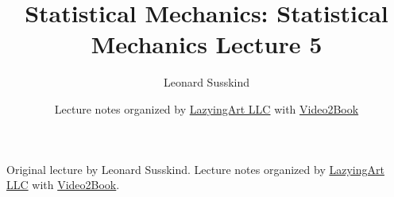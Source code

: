 \documentclass[11pt,oneside]{book}
\begin{document}
\frontmatter
\title{Statistical Mechanics: Statistical Mechanics Lecture 5}
\author{Leonard Susskind}
\date{Lecture notes organized by \href{https://lazying.art}{LazyingArt LLC} with \href{https://github.com/lachlanchen/Video2Book}{Video2Book}}
\maketitle
\begin{center}
\small Original lecture by Leonard Susskind. Lecture notes organized by \href{https://lazying.art}{LazyingArt LLC} with \href{https://github.com/lachlanchen/Video2Book}{Video2Book}.
\end{center}
\clearpage
\mainmatter

\end{document}
